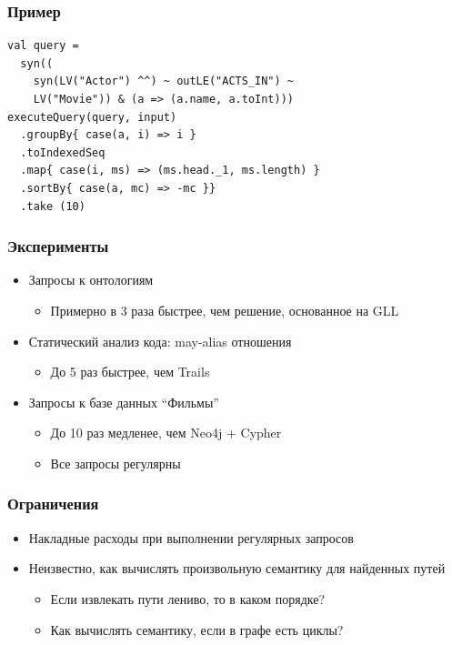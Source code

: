 \documentclass[xcolor=table]{beamer}
\begin{document}
\begin{frame}[fragile]
  \transwipe[direction=90]
  \frametitle{Пример}
\begin{lstlisting}
val query =
  syn((
    syn(LV("Actor") ^^) ~ outLE("ACTS_IN") ~
    LV("Movie")) & (a => (a.name, a.toInt)))
executeQuery(query, input)
  .groupBy{ case(a, i) => i }
  .toIndexedSeq
  .map{ case(i, ms) => (ms.head._1, ms.length) }
  .sortBy{ case(a, mc) => -mc }}
  .take (10)
\end{lstlisting}
\end{frame}


\begin{frame}
  \transwipe[direction=90]
  \frametitle{Эксперименты}
\begin{itemize}
  \item Запросы к онтологиям
  \begin{itemize}
    \item Примерно в 3 раза быстрее, чем решение, основанное на GLL
  \end{itemize}
  \item Статический анализ кода: may-alias отношения
  \begin{itemize}
    \item До 5 раз быстрее, чем Trails
  \end{itemize}
  \item Запросы к базе данных ``Фильмы''
  \begin{itemize}
    \item До 10 раз медленее, чем Neo4j + Cypher
    \item Все запросы регулярны
  \end{itemize}
\end{itemize}

\end{frame}

\begin{frame}
  \transwipe[direction=90]
  \frametitle{Ограничения}
\begin{itemize}
  \item Накладные расходы при выполнении регулярных запросов
  \item Неизвестно, как вычислять произвольную семантику для найденных путей
  \begin{itemize}
    \item Если извлекать пути лениво, то в каком порядке?
    \item Как вычислять семантику, если в графе есть циклы?
  \end{itemize}
\end{itemize}
\end{frame}
\end{document}
